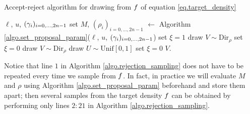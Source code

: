 \documentclass[10pt, article,table]{article}
\begin{document}
\begin{algorithm}
 \caption{Accept-reject algorithm for drawing from $f$ of equation \eqref{eq.target_density}}
 \label{algo.rejection_sampling}
 \begin{algorithmic}[5]
  \REQUIRE $\ell$, $u$, $(\gamma_i)_{i=0,\dots,2n-1}$
  \STATE set $M$, $(\rho_i)_{i=0,\dots,2n-1}$ $\leftarrow$ Algorithm \ref{algo.set_proposal_param}($\ell$, $u$, $(\gamma_i)_{i=0,\dots,2n-1}$)
  \STATE set $\xi = 1$
  \STATE draw $V\sim\text{Dir}_{\rho}$
  \STATE set $\xi=0$
  \ENDIF
  \ENDWHILE
  \ELSE
  \STATE draw $V\sim\text{Dir}_{\rho}$
  \STATE draw $U\sim \text{Unif}[0,1]$
  \STATE set $\xi = 0$
  \ENDIF
  \ENDIF
  \ENDWHILE
  \ENDIF
  \RETURN $V$.
 \end{algorithmic}
\end{algorithm}
\begin{remark}
 Notice that line $1$ in Algorithm \ref{algo.rejection_sampling} does not have to be repeated every time we sample from $f$. In fact, in practice we will evaluate  $M$ and $\rho$ using Algorithm \ref{algo.set_proposal_param} beforehand and store them apart; then several samples from the target density $f$ can be obtained by performing only lines $2:21$ in Algorithm \ref{algo.rejection_sampling}.
\end{remark}
\end{document}
